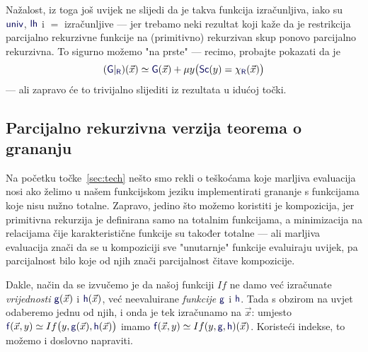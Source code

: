 \begin{napomena}[{name=[restrikcija na izračunljiv skup čuva izračunljivost]}]\label{nap:restrprek}
Nažalost, iz toga još uvijek ne slijedi da je takva funkcija izračunljiva, iako su $\f{univ}$, $\f{lh}$ i $=$ izračunljive --- jer trebamo neki rezultat koji kaže da je restrikcija parcijalno rekurzivne funkcije na (primitivno) rekurzivan skup ponovo parcijalno rekurzivna. To sigurno možemo "na prste" --- recimo, probajte pokazati da je
    \begin{equation}\label{eq:restrprek}
        (\f G|_{\f R})(\vec x)\simeq\f G(\vec x)+\mu y\bigl(\f{Sc}(y)\eq\chi_{\f R}(\vec x)\bigr)
\end{equation}
--- ali zapravo će to trivijalno slijediti iz rezultata u idućoj točki. %
\end{napomena}

\subsection{Parcijalno rekurzivna verzija teorema o grananju}

Na početku točke~\ref{sec:tech} nešto smo rekli o teškoćama koje marljiva evaluacija nosi ako želimo u našem funkcijskom jeziku implementirati grananje s funkcijama koje nisu nužno totalne. Zapravo, jedino što možemo koristiti je kompozicija, jer primitivna rekurzija je definirana samo na totalnim funkcijama, a minimizacija na relacijama čije karakteristične funkcije su također totalne --- ali marljiva evaluacija znači da se u kompoziciji sve "unutarnje" funkcije evaluiraju uvijek, pa parcijalnost bilo koje od njih znači parcijalnost čitave kompozicije.

Dakle, način da se izvučemo je da našoj funkciji $If$ ne damo već izračunate \emph{vrijednosti} $\f g(\vec x)$ i $\f h(\vec x)$, već neevaluirane \emph{funkcije} $\f g$ i $\f h$. Tada s obzirom na uvjet odaberemo jednu od njih, i onda je tek izračunamo na $\vec x$: umjesto $\f f(\vec x,y)\simeq If\bigl(y,\f g(\vec x),\f h(\vec x)\bigr)$ imamo $\f f(\vec x,y)\simeq If(y,\f g,\f h)(\vec x)$. Koristeći indekse, to možemo i doslovno napraviti.

